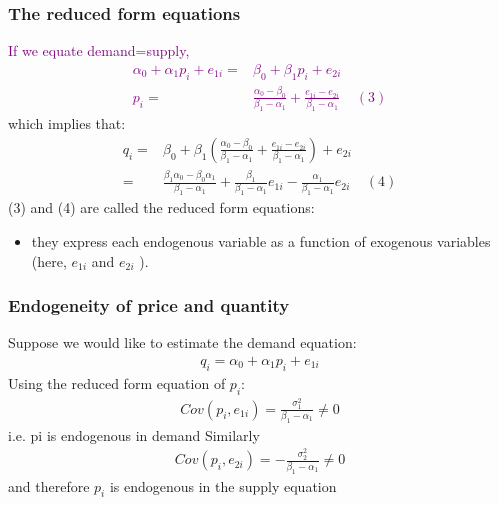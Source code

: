 \documentclass[a4paper,twoside,11pt]{article}
\begin{document}
\subsubsection{The reduced form equations}
\textcolor{Purple}{
If we equate demand=supply,
\begin{equation*}
\begin{aligned}
\alpha_0 + \alpha_1 p_i + e_{1i} =& \beta_0 + \beta_1 p_i + e_{2i} \\
p_i =& \frac{\alpha_0 - \beta_0}{\beta_1 - \alpha_1} + \frac{e_{1i}-e_{2i}}{\beta_1 - \alpha_1} \ \ \ \ \ (3)
\end{aligned} 
\end{equation*}}
which implies that:
\begin{equation*}
\begin{aligned}
q_i =& \beta_0 + \beta_1 (\frac{\alpha_0 - \beta_0}{\beta_1 - \alpha_1} + \frac{e_{1i}-e_{2i}}{\beta_1 - \alpha_1}) + e_{2i} \\
=& \frac{\beta_1 \alpha_0 - \beta_0 \alpha_1}{\beta_1 - \alpha_1} + \frac{\beta_1}{\beta_1 -  \alpha_1}e_{1i} - \frac{\alpha_1}{\beta_1 - \alpha_1} e_{2i} \ \ \ \ \ (4)
\end{aligned} 
\end{equation*}
(3) and (4) are called the reduced form equations:
\begin{itemize}
    \item they express each endogenous variable as a function of exogenous variables (here, $e_{1i}$ and $e_{2i}$ ).
\end{itemize}
\subsubsection{Endogeneity of price and quantity}
Suppose we would like to estimate the demand equation:
\begin{equation*}
\begin{aligned}
q_i = \alpha_0 + \alpha_1 p_i + e_{1i}
\end{aligned} 
\end{equation*}
Using the reduced form equation of $p_i:$
\begin{equation*}
\begin{aligned}
Cov(p_i, e_{1i}) = \frac{\sigma_1^2}{\beta_1 - \alpha_1} \ne 0
\end{aligned} 
\end{equation*}
i.e. pi is endogenous in demand
\newline
\newline
Similarly
\begin{equation*}
\begin{aligned}
Cov(p_i, e_{2i}) = - \frac{\sigma_2^2}{\beta_1 - \alpha_1} \ne 0
\end{aligned} 
\end{equation*}
and therefore $p_i$ is endogenous in the supply equation
\end{document}
